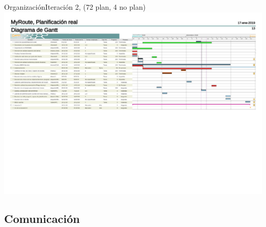 \documentclass{beamer}
\begin{document}
\begin{frame}{Organizaci\'on}{Iteraci\'on 2, (72 plan, 4 no plan)}
\includegraphics[scale=0.1]{images_latex/gantt_itr3}
\end{frame}


\subsection{Comunicaci\'on}
\end{document}
